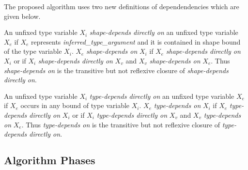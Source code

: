 The proposed algorithm uses two new definitions of dependendencies which are given below.
\begin{defn}
An unfixed type variable \texttt{$X_i$} \emph{shape-depends directly on} an unfixed type variable \texttt{$X_e$} if \texttt{$X_e$} represents \textit{inferred\_type\_argument} and it is contained in shape bound of the type variable \texttt{$X_i$}.
\texttt{$X_e$} \emph{shape-depends on} \texttt{$X_i$} if \texttt{$X_e$} \emph{shape-depends directly on} \texttt{$X_i$} or if \texttt{$X_i$} \emph{shape-depends directly on} \texttt{$X_v$} and \texttt{$X_v$} \emph{shape-depends on} \texttt{$X_e$}. Thus \emph{shape-depends on} is the transitive but not reflexive closure of \emph{shape-depends directly on}.
\end{defn}
\begin{defn}
An unfixed type variable \texttt{$X_i$} \emph{type-depends directly on} an unfixed type variable \texttt{$X_e$} if \texttt{$X_e$} occurs in any bound of type variable \texttt{$X_i$}.
\texttt{$X_e$} \emph{type-depends on} \texttt{$X_i$} if \texttt{$X_e$} \emph{type-depends directly on} \texttt{$X_i$} or if \texttt{$X_i$} \emph{type-depends directly on} \texttt{$X_v$} and \texttt{$X_v$} \emph{type-depends on} \texttt{$X_e$}. 
Thus \emph{type-depends on} is the transitive but not reflexive closure of \emph{type-depends directly on}.
\end{defn}

\subsection{Algorithm Phases}

